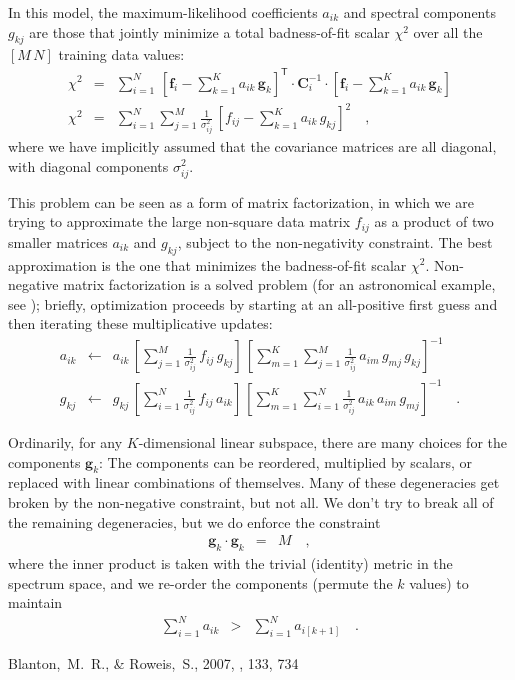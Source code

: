 \documentclass[preprint]{aastex}
\newcommand{\mmatrix}[1]{\boldsymbol{#1}}
\newcommand{\inverse}[1]{{#1}^{-1}}
\newcommand{\transpose}[1]{{#1}^{\mathsf{T}}}
\newcommand{\covar}{\mmatrix{C}}
\newcommand{\fvec}{\mmatrix{f}}
\newcommand{\gvec}{\mmatrix{g}}
\newcommand{\invvar}{\inverse{\covar}}
\begin{document}
In this model, the maximum-likelihood coefficients $a_{ik}$ and
spectral components $g_{kj}$ are those that jointly minimize a total
badness-of-fit scalar $\chi^2$ over all the $[M\,N]$ training data
values:
\begin{eqnarray}\displaystyle
\chi^2 &=& \sum_{i=1}^N 
 \,\transpose{\left[\fvec_i - \sum_{k=1}^K a_{ik}\,\gvec_k\right]}
 \cdot\invvar_i\cdot\left[\fvec_i - \sum_{k=1}^K a_{ik}\,\gvec_k\right]
 \nonumber\\
\chi^2 &=& \sum_{i=1}^N \sum_{j=1}^M \frac{1}{\sigma_{ij}^2}
 \,\left[f_{ij} - \sum_{k=1}^K a_{ik}\,g_{kj}\right]^2
\quad ,
\end{eqnarray}
where we have implicitly assumed that the covariance matrices are all
diagonal, with diagonal components $\sigma_{ij}^2$.

This problem can be seen as a form of matrix factorization, in which
we are trying to approximate the large non-square data matrix $f_{ij}$
as a product of two smaller matrices $a_{ik}$ and $g_{kj}$, subject to
the non-negativity constraint.  The best approximation is the one that
minimizes the badness-of-fit scalar $\chi^2$.  Non-negative matrix
factorization is a solved problem (for an astronomical example, see
\citealt{kcorrect}); briefly, optimization proceeds by starting
at an all-positive first guess and then iterating these multiplicative
updates:
\begin{eqnarray}\displaystyle
a_{ik} &\leftarrow& a_{ik}
 \,\left[\sum_{j=1}^M\frac{1}{\sigma_{ij}^2}\,f_{ij}\,g_{kj}\right]
 \,\left[\sum_{m=1}^K\sum_{j=1}^M\frac{1}{\sigma_{ij}^2}\,a_{im}\,g_{mj}\,g_{kj}\right]^{-1}
\nonumber\\
g_{kj} &\leftarrow& g_{kj}
 \,\left[\sum_{i=1}^N\frac{1}{\sigma_{ij}^2}\,f_{ij}\,a_{ik}\right]
 \,\left[\sum_{m=1}^K\sum_{i=1}^N\frac{1}{\sigma_{ij}^2}\,a_{ik}\,a_{im}\,g_{mj}\right]^{-1}
\quad .
\end{eqnarray}

Ordinarily, for any $K$-dimensional linear subspace, there are many
choices for the components $\gvec_k$: The components can be reordered,
multiplied by scalars, or replaced with linear combinations of
themselves.  Many of these degeneracies get broken by the non-negative
constraint, but not all.  We don't try to break all of the remaining
degeneracies, but we do enforce the constraint
\begin{eqnarray}\displaystyle
\gvec_k\cdot\gvec_k &=& M
\quad,
\end{eqnarray}
where the inner product is taken with the trivial (identity) metric in
the spectrum space, and we re-order the components (permute the $k$
values) to maintain
\begin{eqnarray}\displaystyle
\sum_{i=1}^N a_{ik} &>& \sum_{i=1}^N a_{i[k+1]}
\quad.
\end{eqnarray}

\begin{thebibliography}{70}
Blanton,~M.~R., \& Roweis,~S., 2007, \aj, 133, 734 
\end{thebibliography}
\end{document}
